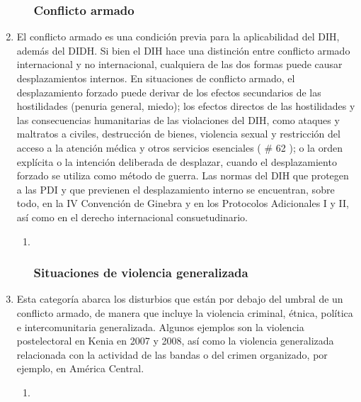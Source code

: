 \documentclass[
]{book}
\begin{document}
\begin{enumerate}
\begin{enumerate}
{    \subsubsection{Conflicto armado}\label{conflicto-armado}}
  \end{enumerate}
\item
  El conflicto armado es una condición previa para la aplicabilidad del DIH, además del DIDH. Si bien el DIH hace una distinción entre conflicto armado internacional y no internacional, cualquiera de las dos formas puede causar desplazamientos internos. En situaciones de conflicto armado, el desplazamiento forzado puede derivar de los efectos secundarios de las hostilidades (penuria general, miedo); los efectos directos de las hostilidades y las consecuencias humanitarias de las violaciones del DIH, como ataques y maltratos a civiles, destrucción de bienes, violencia sexual y restricción del acceso a la atención médica y otros servicios esenciales (
  \# 62
  ); o la orden explícita o la intención deliberada de desplazar, cuando el desplazamiento forzado se utiliza como método de guerra. Las normas del DIH que protegen a las PDI y que previenen el desplazamiento interno se encuentran, sobre todo, en la IV Convención de Ginebra y en los Protocolos Adicionales I y II, así como en el derecho internacional consuetudinario.

  \begin{enumerate}
  \def\labelenumii{\arabic{enumii}.}
  \item ~
    \hypertarget{situaciones-de-violencia-generalizada}{%
    \subsubsection{Situaciones de violencia generalizada}\label{situaciones-de-violencia-generalizada}}
  \end{enumerate}
\item
  Esta categoría abarca los disturbios que están por debajo del umbral de un conflicto armado, de manera que incluye la violencia criminal, étnica, política e intercomunitaria generalizada. Algunos ejemplos son la violencia postelectoral en Kenia en 2007 y 2008, así como la violencia generalizada relacionada con la actividad de las bandas o del crimen organizado, por ejemplo, en América Central.

  \begin{enumerate}
  \def\labelenumii{\arabic{enumii}.}
  \item ~
    \hypertarget{violaciones-de-los-derechos-humanos}{%
}
\end{enumerate}
\end{enumerate}
\end{document}
